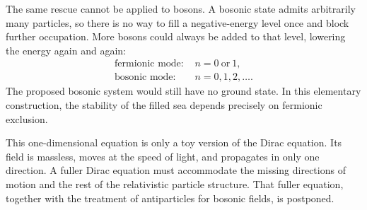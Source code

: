 The same rescue cannot be applied to bosons. A bosonic state admits arbitrarily many particles, so there is no way to fill a negative-energy level once and block further occupation. More bosons could always be added to that level, lowering the energy again and again:
\begin{equation}
\begin{aligned}
\text{fermionic mode: }&n=0\ \text{or}\ 1,\\
\text{bosonic mode: }&n=0,1,2,\ldots .
\end{aligned}
\end{equation}
The proposed bosonic system would still have no ground state. In this elementary construction, the stability of the filled sea depends precisely on fermionic exclusion.

This one-dimensional equation is only a toy version of the Dirac equation. Its field is massless, moves at the speed of light, and propagates in only one direction. A fuller Dirac equation must accommodate the missing directions of motion and the rest of the relativistic particle structure. That fuller equation, together with the treatment of antiparticles for bosonic fields, is postponed.
